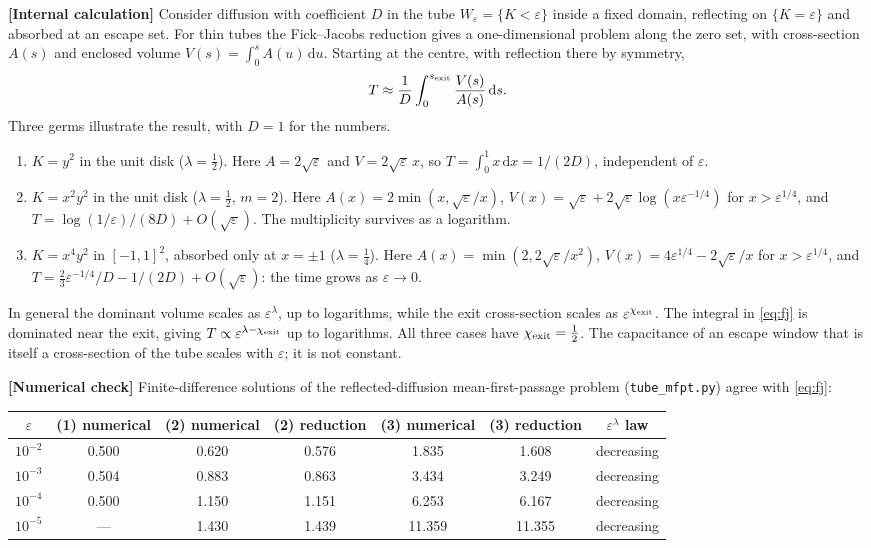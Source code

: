 \documentclass[11pt,a4paper]{article}
\newcommand{\eps}{\varepsilon}
\newcommand{\dd}{\mathrm d}
\newcommand{\evl}[2]{{\small\bfseries\color{#1}[#2]}}
\newcommand{\LCalc}{\evl{ccalc}{Internal calculation}}
\newcommand{\LNum}{\evl{cnum}{Numerical check}}
\begin{document}
\LCalc{} Consider diffusion with coefficient $D$ in the tube
$W_\eps=\{K<\eps\}$ inside a fixed domain, reflecting on $\{K=\eps\}$ and
absorbed at an escape set. For thin tubes the Fick--Jacobs reduction
\cite{zwanzig1992,reguera2001} gives a one-dimensional problem along the
zero set, with cross-section $A(s)$ and enclosed volume
$V(s)=\int_0^sA(u)\,\dd u$. Starting at the centre, with reflection there
by symmetry,
\begin{equation}
T\approx\frac1D\int_0^{s_{\rm exit}}\frac{V(s)}{A(s)}\,\dd s .
\label{eq:fj}
\end{equation}
Three germs illustrate the result, with $D=1$ for the numbers.
\begin{enumerate}[leftmargin=*]
\item $K=y^2$ in the unit disk ($\lambda=\tfrac12$). Here $A=2\sqrt\eps$
and $V=2\sqrt\eps\,x$, so $T=\int_0^1x\,\dd x=1/(2D)$, independent of
$\eps$.
\item $K=x^2y^2$ in the unit disk ($\lambda=\tfrac12$, $m=2$). Here
$A(x)=2\min(x,\sqrt\eps/x)$, $V(x)=\sqrt\eps+2\sqrt\eps\log(x\eps^{-1/4})$
for $x>\eps^{1/4}$, and $T=\log(1/\eps)/(8D)+O(\sqrt\eps)$. The
multiplicity survives as a logarithm.
\item $K=x^4y^2$ in $[-1,1]^2$, absorbed only at $x=\pm1$ ($\lambda=\tfrac14$).
Here $A(x)=\min(2,2\sqrt\eps/x^2)$, $V(x)=4\eps^{1/4}-2\sqrt\eps/x$ for
$x>\eps^{1/4}$, and $T=\tfrac23\eps^{-1/4}/D-1/(2D)+O(\sqrt\eps)$: the
time grows as $\eps\to0$.
\end{enumerate}
In general the dominant volume scales as $\eps^\lambda$, up to
logarithms, while the exit cross-section scales as $\eps^{\chi_{\rm exit}}$.
The integral in \eqref{eq:fj} is dominated near the exit, giving
$T\propto\eps^{\lambda-\chi_{\rm exit}}$ up to logarithms. All three
cases have $\chi_{\rm exit}=\tfrac12$. The capacitance of an escape window
that is itself a cross-section of the tube scales with $\eps$; it is not
constant.

\LNum{} Finite-difference solutions of the reflected-diffusion
mean-first-passage problem (\texttt{tube\_mfpt.py}) agree with
\eqref{eq:fj}:

\begin{center}\small
\begin{tabular}{@{}ccccccc@{}}
\toprule
$\eps$ & (1) numerical & (2) numerical & (2) reduction & (3) numerical & (3) reduction & $\eps^\lambda$ law \\
\midrule
$10^{-2}$ & 0.500 & 0.620 & 0.576 & 1.835 & 1.608 & decreasing \\
$10^{-3}$ & 0.504 & 0.883 & 0.863 & 3.434 & 3.249 & decreasing \\
$10^{-4}$ & 0.500 & 1.150 & 1.151 & 6.253 & 6.167 & decreasing \\
$10^{-5}$ & --- & 1.430 & 1.439 & 11.359 & 11.355 & decreasing \\
\bottomrule
\end{tabular}
\end{center}
\end{document}
